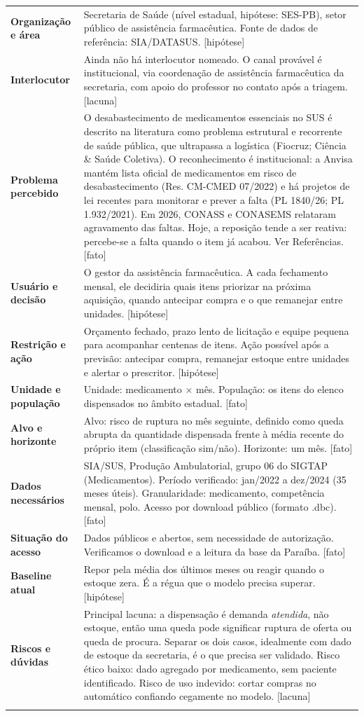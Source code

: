 \documentclass[11pt,a4paper]{article}
\newcommand{\campo}[2]{\textbf{#1} & #2 \\ \addlinespace[1pt]}
\newcommand{\fato}{\textcolor{azulmls}{\footnotesize[fato]}}
\newcommand{\hip}{\textcolor{cinzatexto}{\footnotesize[hipótese]}}
\newcommand{\lac}{\textcolor{cinzatexto}{\footnotesize[lacuna]}}
\begin{document}
\begin{tabularx}{\textwidth}{@{}L X@{}}
\toprule
\campo{Organização e área}{Secretaria de Saúde (nível estadual, hipótese: SES-PB), setor público de assistência farmacêutica. Fonte de dados de referência: SIA/DATASUS. \hip}
\campo{Interlocutor}{Ainda não há interlocutor nomeado. O canal provável é institucional, via coordenação de assistência farmacêutica da secretaria, com apoio do professor no contato após a triagem. \lac}
\campo{Problema percebido}{O desabastecimento de medicamentos essenciais no SUS é descrito na literatura como problema estrutural e recorrente de saúde pública, que ultrapassa a logística (Fiocruz; Ciência \& Saúde Coletiva). O reconhecimento é institucional: a Anvisa mantém lista oficial de medicamentos em risco de desabastecimento (Res. CM-CMED 07/2022) e há projetos de lei recentes para monitorar e prever a falta (PL 1840/26; PL 1.932/2021). Em 2026, CONASS e CONASEMS relataram agravamento das faltas. Hoje, a reposição tende a ser reativa: percebe-se a falta quando o item já acabou. Ver Referências. \fato}
\campo{Usuário e decisão}{O gestor da assistência farmacêutica. A cada fechamento mensal, ele decidiria quais itens priorizar na próxima aquisição, quando antecipar compra e o que remanejar entre unidades. \hip}
\campo{Restrição e ação}{Orçamento fechado, prazo lento de licitação e equipe pequena para acompanhar centenas de itens. Ação possível após a previsão: antecipar compra, remanejar estoque entre unidades e alertar o prescritor. \hip}
\campo{Unidade e população}{Unidade: medicamento $\times$ mês. População: os itens do elenco dispensados no âmbito estadual. \fato}
\campo{Alvo e horizonte}{Alvo: risco de ruptura no mês seguinte, definido como queda abrupta da quantidade dispensada frente à média recente do próprio item (classificação sim/não). Horizonte: um mês. \fato}
\campo{Dados necessários}{SIA/SUS, Produção Ambulatorial, grupo 06 do SIGTAP (Medicamentos). Período verificado: jan/2022 a dez/2024 (35 meses úteis). Granularidade: medicamento, competência mensal, polo. Acesso por download público (formato .dbc). \fato}
\campo{Situação do acesso}{Dados públicos e abertos, sem necessidade de autorização. Verificamos o download e a leitura da base da Paraíba. \fato}
\campo{Baseline atual}{Repor pela média dos últimos meses ou reagir quando o estoque zera. É a régua que o modelo precisa superar. \hip}
\campo{Riscos e dúvidas}{Principal lacuna: a dispensação é demanda \emph{atendida}, não estoque, então uma queda pode significar ruptura de oferta ou queda de procura. Separar os dois casos, idealmente com dado de estoque da secretaria, é o que precisa ser validado. Risco ético baixo: dado agregado por medicamento, sem paciente identificado. Risco de uso indevido: cortar compras no automático confiando cegamente no modelo. \lac}
\bottomrule
\end{tabularx}
\end{document}
